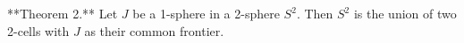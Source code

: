 **Theorem 2.** Let $J$ be a 1-sphere in a 2-sphere $S^2$. Then $S^2$ is the union of two 2-cells with $J$ as their common frontier.
